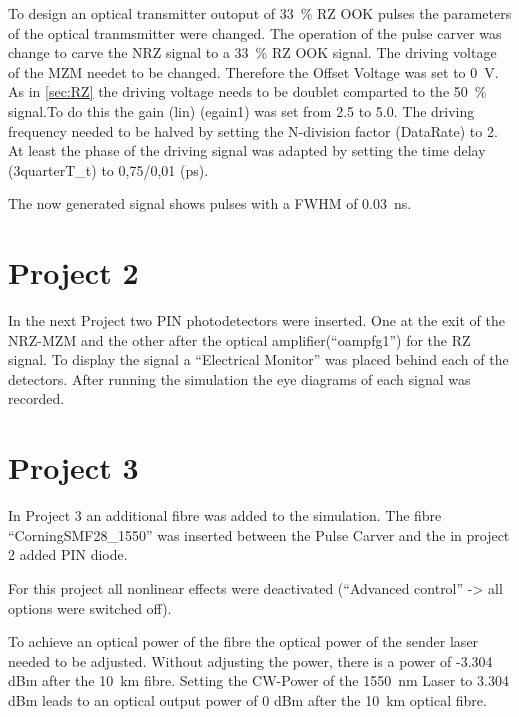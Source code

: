 To design an optical transmitter outoput of 33~\% RZ OOK pulses the parameters of the optical tranmsmitter were changed. 
The operation of the pulse carver was change to carve the NRZ signal to a 33~\% RZ OOK signal. The driving voltage of the MZM needet to be changed. Therefore the Offset Voltage was set to 0~V. As in \ref{sec:RZ} the driving voltage needs to be doublet comparted to the 50~\% signal.To do this the gain (lin) (egain1) was set from 2.5 to 5.0. The driving frequency needed to be halved by setting the N-division factor (DataRate) to 2.
At least the phase of the driving signal was adapted by setting the time delay (3quarterT\_t) to 0,75/0,01 (ps).

The now generated signal shows pulses with a FWHM of 0.03~ns.



\section{Project 2}
In the next Project two PIN photodetectors were inserted. One at the exit of the NRZ-MZM and the other after the optical amplifier("`oampfg1"') for the RZ signal. To display the signal a "`Electrical Monitor"' was placed behind each of the detectors. After running the simulation the eye diagrams of each signal was recorded. 







\section{Project 3}
\label{sec:P3}
In Project 3 an additional fibre was added to the simulation. The fibre "`CorningSMF28\_1550"' was inserted between the Pulse Carver and the in project 2 added PIN diode. 

For this project all nonlinear effects were deactivated ("`Advanced control"' -> all options were switched off).

To achieve an optical power of the fibre the optical power of the sender laser needed to be adjusted. Without adjusting the power, there is a power of -3.304 dBm after the 10~km fibre. Setting the CW-Power of the 1550~nm Laser to 3.304 dBm leads to an optical output power of 0 dBm after the 10~km optical fibre.

